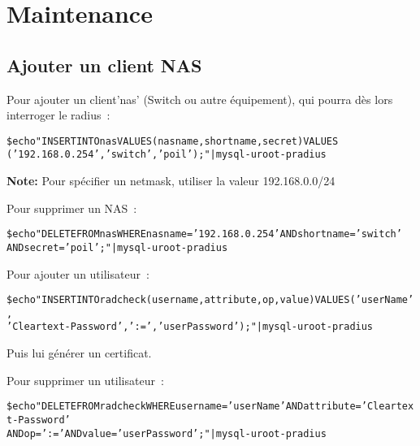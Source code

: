 \section{Maintenance}

\subsection{Ajouter un client NAS}

Pour ajouter un client'nas' (Switch ou autre équipement), qui pourra dès lors interroger le radius~:

\begin{alltt}
\$ echo "INSERT INTO nas VALUES (nasname, shortname, secret) VALUES \\('192.168.0.254','switch','poil');" | mysql -uroot -p radius
\end{alltt}

\textbf{Note:} Pour spécifier un netmask, utiliser la valeur 192.168.0.0/24

Pour supprimer un NAS~:
\begin{alltt}
\$ echo "DELETE FROM nas WHERE nasname='192.168.0.254' AND shortname='switch' \\AND secret='poil';" | mysql -uroot -p radius
\end{alltt}


Pour ajouter un utilisateur~:
\begin{alltt}
\$ echo "INSERT INTO radcheck(username,attribute,op,value) VALUES ('userName',\\'Cleartext-Password',':=','userPassword');" | mysql -uroot -p radius
\end{alltt}
Puis lui générer un certificat.

Pour supprimer un utilisateur~:
\begin{alltt}
\$ echo "DELETE FROM radcheck WHERE username='userName' AND attribute='Cleartext-Password'\\ AND op=':=' AND value='userPassword';" | mysql -uroot -p radius
\end{alltt}

